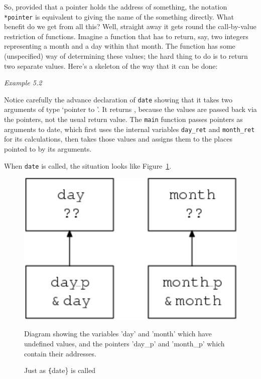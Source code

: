    So, provided that a pointer holds the address of something, the
    notation \texttt{*pointer} is equivalent to giving the name of the
    something directly. What benefit do we get from all this? Well, straight
    away it gets round the call-by-value restriction of functions. Imagine
    a function that has to return, say, two integers representing a month
    and a day within that month. The function has some (unspecified) way of
    determining these values; the hard thing to do is to return two separate
    values. Here's a skeleton of the way that it can be done:


    \begin{center}\textit{Example 5.2}\end{center}


   Notice carefully the advance declaration of \texttt{date} showing
    that it takes two arguments of type `pointer to \kint{}'.
    It returns \void, because the values are passed back via the
    pointers, not the usual return value. The \texttt{main} function
    passes pointers as arguments to date, which first uses the internal
    variables \texttt{day\_ret} and \texttt{month\_ret} for its
    calculations, then takes those values and assigns them to the places
    pointed to by its arguments.


    When \texttt{date} is called,
    the situation looks like Figure~\ref{fig:callDate}.


   \begin{figure}[htb]\centering
     \includegraphics[type=pdf,read=.pdf,ext=.pdf,scale=0.5]
     {figure/5.5_callDate}
     \caption*{Diagram showing the variables 'day' and 'month'
       which have undefined values,
       and the pointers 'day\_p' and 'month\_p' which contain their addresses.}
     \caption{\label{fig:callDate}Just as \texttt\{date\} is called}
   \end{figure}




